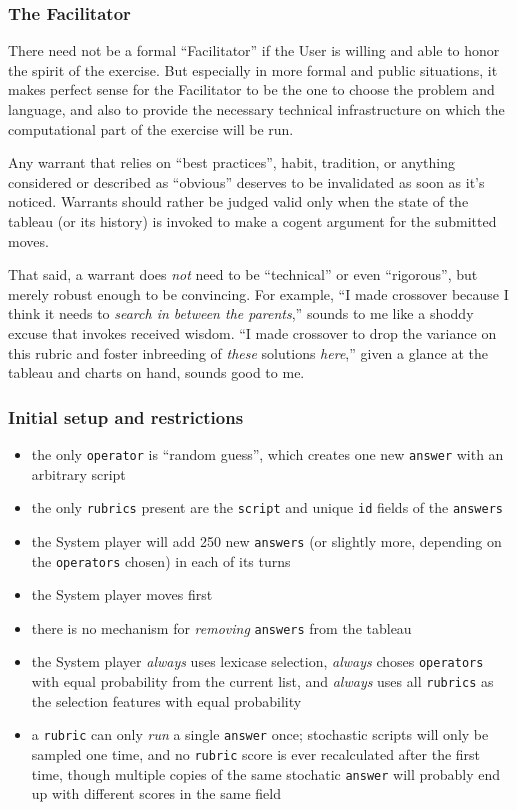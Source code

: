 \subsubsection{The Facilitator}\hypertarget{the-facilitator}{}\label{the-facilitator}

There need not be a formal ``Facilitator'' if the User is willing and able to honor the spirit of the exercise. But especially in more formal and public situations, it makes perfect sense for the Facilitator to be the one to choose the problem and language, and also to provide the necessary technical infrastructure on which the computational part of the exercise will be run.

Any warrant that relies on ``best practices'', habit, tradition, or anything considered or described as ``obvious'' deserves to be invalidated as soon as it's noticed. Warrants should rather be judged valid only when the state of the tableau (or its history) is invoked to make a cogent argument for the submitted moves.

That said, a warrant does \emph{not} need to be ``technical'' or even ``rigorous'', but merely robust enough to be convincing. For example, ``I made crossover because I think it needs to \emph{search in between the parents},'' sounds to me like a shoddy excuse that invokes received wisdom. ``I made crossover to drop the variance on this rubric and foster inbreeding of \emph{these} solutions \emph{here},'' given a glance at the tableau and charts on hand, sounds good to me.

\subsubsection{Initial setup and restrictions}\hypertarget{initial-setup-and-restrictions}{}\label{initial-setup-and-restrictions}

\begin{itemize}
\item the only {\tt operator} is ``random guess'', which creates one new {\tt answer} with an arbitrary script
\item the only {\tt rubrics} present are the {\tt script} and unique {\tt id} fields of the {\tt answers}
\item the System player will add 250 new {\tt answers} (or slightly more, depending on the {\tt operators} chosen) in each of its turns
\item the System player moves first
\item there is no mechanism for \emph{removing} {\tt answers} from the tableau
\item the System player \emph{always} uses lexicase selection, \emph{always} choses {\tt operators} with equal probability from the current list, and \emph{always} uses all {\tt rubrics} as the selection features with equal probability
\item a {\tt rubric} can only \emph{run} a single {\tt answer} once; stochastic scripts will only be sampled one time, and no {\tt rubric} score is ever recalculated after the first time, though multiple copies of the same stochatic {\tt answer} will probably end up with different scores in the same field
\end{itemize}

